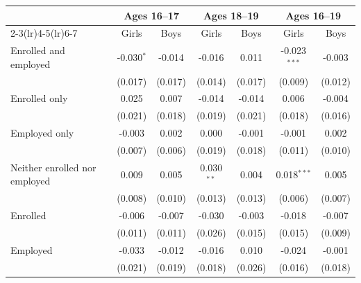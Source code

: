 \begin{tabular}{lcccccc}
\toprule
 & \multicolumn{2}{c}{Ages 16--17} & \multicolumn{2}{c}{Ages 18--19} & \multicolumn{2}{c}{Ages 16--19} \\
\cmidrule(lr){2-3}\cmidrule(lr){4-5}\cmidrule(lr){6-7}
 & Girls & Boys & Girls & Boys & Girls & Boys \\
\midrule
Enrolled and employed & -0.030$^{*}$ & -0.014 & -0.016 & 0.011 & -0.023$^{***}$ & -0.003 \\
 & (0.017) & (0.017) & (0.014) & (0.017) & (0.009) & (0.012) \\
Enrolled only & 0.025 & 0.007 & -0.014 & -0.014 & 0.006 & -0.004 \\
 & (0.021) & (0.018) & (0.019) & (0.021) & (0.018) & (0.016) \\
Employed only & -0.003 & 0.002 & 0.000 & -0.001 & -0.001 & 0.002 \\
 & (0.007) & (0.006) & (0.019) & (0.018) & (0.011) & (0.010) \\
Neither enrolled nor employed & 0.009 & 0.005 & 0.030$^{**}$ & 0.004 & 0.018$^{***}$ & 0.005 \\
 & (0.008) & (0.010) & (0.013) & (0.013) & (0.006) & (0.007) \\
Enrolled & -0.006 & -0.007 & -0.030 & -0.003 & -0.018 & -0.007 \\
 & (0.011) & (0.011) & (0.026) & (0.015) & (0.015) & (0.009) \\
Employed & -0.033 & -0.012 & -0.016 & 0.010 & -0.024 & -0.001 \\
 & (0.021) & (0.019) & (0.018) & (0.026) & (0.016) & (0.018) \\
\bottomrule
\end{tabular}
